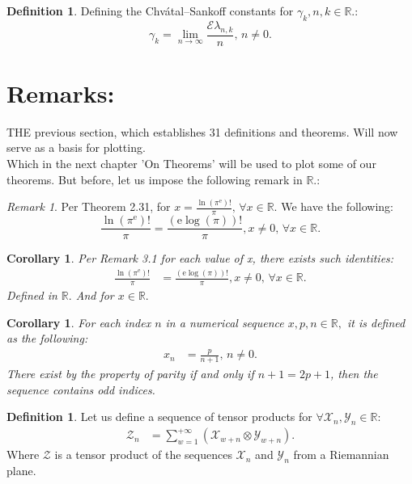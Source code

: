 \documentclass[10pt]{article}
\theoremstyle{plain}
\newtheorem{corollary}[theorem]{Corollary}
\theoremstyle{definition}
\newtheorem{definition}[theorem]{Definition}
\theoremstyle{remark}
\newtheorem{remark}[theorem]{Remark}
\begin{document}
\begin{definition}
	Defining the Chvátal–Sankoff constants for $\gamma_k, n, k \in \mathbb{R}.$:
	\begin{equation}
		\gamma_k = \lim_{n \to \infty} \frac{\mathrm{\mathcal{E}}{\lambda_{n, k}}}{n}, \, n \neq 0.
	\end{equation}
\end{definition}

\section{Remarks:}
\lettrine[lines=2, lhang=0.1, loversize=0.2]{T}HE previous section, which establishes 31 definitions and theorems. Will now serve as a basis for plotting.\\
Which in the next chapter 'On Theorems' will be used to plot some of our theorems. But before, let us impose the following remark in $\mathbb{R}.$:

\begin{remark}
	Per Theorem 2.31, for $x = \frac{\ln(\pi^\mathrm{e})!}{\pi}, \, \forall x \in \mathbb{R}.$ We have the following:
	\begin{equation}
		\frac{\ln(\pi^\mathrm{e})!}{\pi} = \frac{(\mathrm{e} \log(\pi))!}{\pi}, x \neq 0, \, \forall x \in \mathbb{R}.
	\end{equation}
\end{remark}

\begin{corollary}
	Per Remark 3.1 for each value of x, there exists such identities:
	\begin{align*}
		\frac{\ln(\pi^\mathrm{e})!}{\pi} &= \frac{(\mathrm{e} \log(\pi))!}{\pi}, x \neq 0, \, \forall x \in \mathbb{R}.
	\end{align*}
	Defined in $\mathbb{R}.$ And for $x \in \mathbb{R}.$
\end{corollary}

\begin{corollary}
	For each index $n$ in a numerical sequence $x, p, n \in \mathbb{R},$ it is defined as the following:
	\begin{align*}
		x_n &= \frac{p}{n+1}, \, n \neq 0.
	\end{align*}
	There exist by the property of parity if and only if $n+1 = 2p + 1$, then the sequence contains  odd indices.
\end{corollary}

\begin{definition}
	Let us define a sequence of tensor products for $\forall \mathcal{X}_n, \mathcal{Y}_n \in \mathbb{R}$:
	\begin{align*}
		\mathcal{Z}_n &= \sum_{w=1}^{+\infty} (\mathcal{X}_{w+n} \otimes \mathcal{Y}_{w+n}).
	\end{align*}
	Where $\mathcal{Z}$ is a tensor product of the sequences $\mathcal{X}_n$ and $\mathcal{Y}_n$ from a Riemannian plane.
\end{definition}
\end{document}
